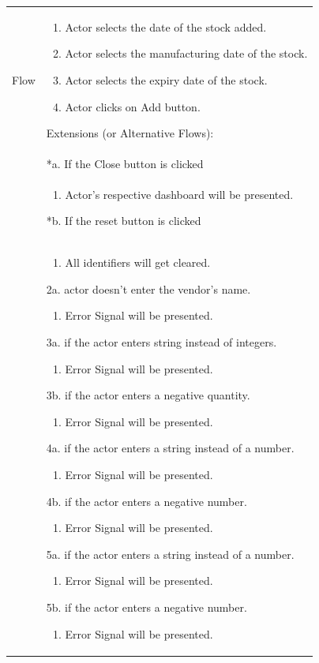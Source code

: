 \documentclass[12pt,a4paper]{report}
\begin{document}
\begin{tabular}{ | m{3cm} | m{12cm}| } \hline
Flow &
\begin{enumerate}
\item Actor selects the date of the stock added.
\item Actor selects the manufacturing date of the stock.
\item Actor selects the expiry date of the stock.
\item Actor clicks on Add button.
\end{enumerate}

Extensions (or Alternative Flows):\\
& *a. If the Close button is clicked \\
& \begin{enumerate}
		\item Actor's respective dashboard will be presented.
	\end{enumerate}
*b. If the reset button is clicked \\
&	\begin{enumerate}
		\item All identifiers will get cleared.
	\end{enumerate}
2a. actor doesn't enter the vendor's name.
 	\begin{enumerate}
		\item Error Signal will be presented.
	\end{enumerate}
3a. if the actor enters string instead of integers.
 	\begin{enumerate}
		\item Error Signal will be presented.
	\end{enumerate}
3b. if the actor enters a negative quantity.
 	\begin{enumerate}
		\item Error Signal will be presented.
	\end{enumerate}

4a. if the actor enters a string instead of a number.
 	\begin{enumerate}
		\item Error Signal will be presented.
	\end{enumerate}
4b. if the actor enters a negative number.
 	\begin{enumerate}
		\item Error Signal will be presented.
	\end{enumerate}
5a. if the actor enters a string instead of a number.
 	\begin{enumerate}
		\item Error Signal will be presented.
	\end{enumerate}
5b. if the actor enters a negative number.
 	\begin{enumerate}
		\item Error Signal will be presented.
	\end{enumerate}
\\ \hline
\end{tabular}
\end{document}
